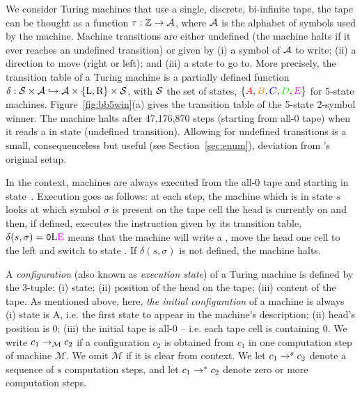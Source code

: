 We consider Turing machines that use a single, discrete, bi-infinite tape, \ie the tape can be thought as a function $\tau: \mathbb{Z} \to \mathcal{A}$, where $\mathcal{A}$ is the alphabet of symbols used by the machine. Machine transitions are either undefined (the machine halts if it ever reaches an undefined transition) or given by (i) a symbol of $\mathcal{A}$ to write; (ii) a direction to move (right or left); and (iii) a state to go to. More precisely, the transition table of a Turing machine is a partially defined function $\delta: \mathcal{S} \times \mathcal{A} \hookrightarrow \mathcal{A} \times \{\text{L},\text{R}\} \times \mathcal{S} $, with $\mathcal{S}$ the set of states, \eg $\{\stateA,\stateB,\stateC,\stateD,\stateE\}$ for 5-state machines. Figure~\ref{fig:bb5win}(a) gives the transition table of the 5-state 2-symbol \BBfull winner. The machine halts after 47,176,870 steps (starting from all-0 tape) when it reads a \szero in state \stateE (undefined transition). Allowing for undefined transitions is a small, consequenceless but useful (see Section~\ref{sec:enum}), deviation from \rado's original setup.

In the \BBfull context, machines are always executed from the all-0 tape and starting in state~\stateA. Execution goes as follows: at each step, the machine which is in state $s$ looks at which symbol $\sigma$ is present on the tape cell the head is currently on and then, if defined, executes the instruction given by its transition table, \eg $\delta(s, \sigma) = \szero\text{L}\text{\stateE}$ means that the machine will write a \szero, move the head one cell to the left and switch to state \stateE. If $\delta(s, \sigma)$ is not defined, the machine halts.



A \textit{configuration} (also known as \textit{execution state}) of a Turing machine is defined by the 3-tuple: (i) state; (ii) position of the head on the tape; (iii) content of the tape. As mentioned above, here, \textit{the initial configuration} of a machine is always (i) state is A, i.e. the first state to appear in the machine's description; (ii) head's position is 0; (iii) the initial tape is all-0 -- i.e. each tape cell is containing 0. We write $c_1 \to_\mathcal{M} c_2$ if a configuration $c_2$ is obtained from $c_1$ in one computation step of machine $\mathcal{M}$. We omit $\mathcal{M}$ if it is clear from context. We let $c_1 \to^s c_2$ denote a sequence of $s$ computation steps, and let $c_1 \to^* c_2$ denote zero or more computation steps. %


